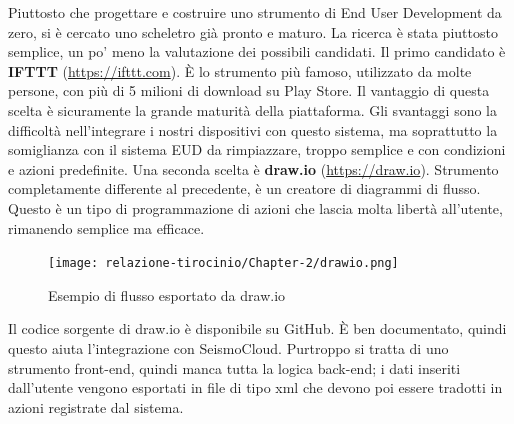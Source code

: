 \documentclass[a4paper,10pt]{memoir}
\begin{document}
Piuttosto che progettare e costruire uno strumento di End User Development da zero, si è cercato uno scheletro già pronto e maturo. La ricerca è stata piuttosto semplice, un po' meno la valutazione dei possibili candidati.
Il primo candidato è \textbf{IFTTT} (\href{https://iftt.com}{https://ifttt.com}). È lo strumento più famoso, utilizzato da molte persone, con più di 5 milioni di download su Play Store. Il vantaggio di questa scelta è sicuramente la grande maturità della piattaforma. Gli svantaggi sono la difficoltà nell'integrare i nostri dispositivi con questo sistema, ma soprattutto la somiglianza con il sistema EUD da rimpiazzare, troppo semplice e con condizioni e azioni predefinite.
Una seconda scelta è \textbf{draw.io} (\href{https://app.diagrams.net/}{https://draw.io}). Strumento completamente differente al precedente, è un creatore di diagrammi di flusso. Questo è un tipo di programmazione di azioni che lascia molta libertà all'utente, rimanendo semplice ma efficace. 
\begin{figure}[H]
\caption{Esempio di flusso esportato da draw.io}
\label{fig:drawio}
\texttt{[image: relazione-tirocinio/Chapter-2/drawio.png]}
\end{figure}
Il codice sorgente di draw.io è disponibile su GitHub. È  ben documentato, quindi questo aiuta l'integrazione con SeismoCloud. Purtroppo si tratta di uno strumento front-end, quindi manca tutta la logica back-end; i dati inseriti dall'utente vengono esportati in file di tipo xml che devono poi essere tradotti in azioni registrate dal sistema. 
\end{document}
